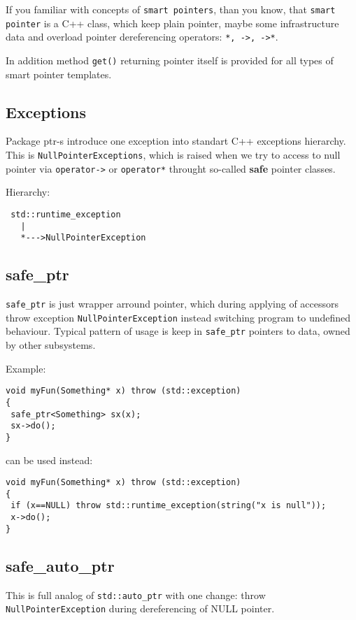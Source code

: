 \documentclass[10pt]{article}
\begin{document}
 If you familiar with concepts of \verb|smart pointers|, than you know, that
\verb|smart pointer| is a C++ class, which keep plain pointer, maybe
some infrastructure data and overload pointer dereferencing operators:
\verb|*, ->, ->*|.

 In addition  method \verb|get()| returning pointer itself is
provided for all types of smart pointer templates.

\subsection{ Exceptions }

 Package ptr-s introduce one exception into standart C++ exceptions
hierarchy. This is \verb|NullPointerExceptions|, which is raised when we
try to access to null pointer via \verb|operator->| or \verb|operator*| 
throught so-called {\bf safe} pointer classes.

Hierarchy:
\begin{verbatim}
 std::runtime_exception
   |
   *--->NullPointerException
\end{verbatim}

\subsection{ safe\_ptr }

 \verb|safe_ptr| is just wrapper arround pointer, which during applying
of accessors throw exception \verb|NullPointerException| instead switching
program to undefined behaviour.
 Typical pattern of usage is keep in \verb|safe_ptr| pointers to data,
owned by other subsystems. 

Example:
\begin{verbatim}
void myFun(Something* x) throw (std::exception)
{
 safe_ptr<Something> sx(x);
 sx->do();
}
\end{verbatim}
can be used instead:
\begin{verbatim}
void myFun(Something* x) throw (std::exception)
{
 if (x==NULL) throw std::runtime_exception(string("x is null"));
 x->do();
}
\end{verbatim}

\subsection{ safe\_auto\_ptr }

 This is full analog of \verb|std::auto_ptr| with one change: 
throw \verb|NullPointerException| during dereferencing of NULL pointer.
\end{document}
